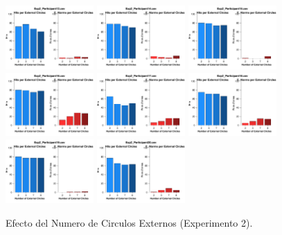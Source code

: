\begin{figure}[th]
\includegraphics[width=0.30\textwidth]{Figures/Numero_Exp2_P13} \includegraphics[width=0.30\textwidth]{Figures/Numero_Exp2_P14} \includegraphics[width=0.30\textwidth]{Figures/Numero_Exp2_P15}
\includegraphics[width=0.30\textwidth]{Figures/Numero_Exp2_P16} \includegraphics[width=0.30\textwidth]{Figures/Numero_Exp2_P17} \includegraphics[width=0.30\textwidth]{Figures/Numero_Exp2_P18}
\includegraphics[width=0.30\textwidth]{Figures/Numero_Exp2_P19} \includegraphics[width=0.30\textwidth]{Figures/Numero_Exp2_P20} 
\caption[Numero_Exp2]{Efecto del Numero de Circulos Externos (Experimento 2).}
\label{fig:Numero_E2}
\end{figure}
